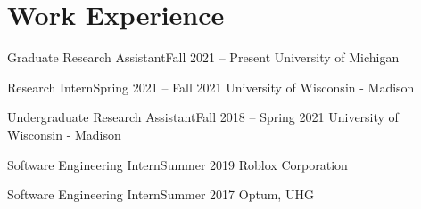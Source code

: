 \section{Work Experience}
  \CVSubHeadingListStart

    \CVSubheading
      {Graduate Research Assistant}{Fall 2021 -- Present}
      {University of Michigan}{}
      
    \CVSubheading
      {Research Intern}{Spring 2021 -- Fall 2021}
      {University of Wisconsin - Madison}{}
      
    \CVSubheading
      {Undergraduate Research Assistant}{Fall 2018 -- Spring 2021}
      {University of Wisconsin - Madison}{}

    \CVSubheading
      {Software Engineering Intern}{Summer 2019}
      {Roblox Corporation}{}

    \CVSubheading
      {Software Engineering Intern}{Summer 2017}
      {Optum, UHG}{}

  \CVSubHeadingListEnd